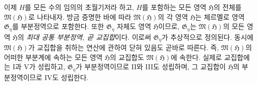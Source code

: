 
이제 $H$를 모든 수의 임의의 초월기저라 하고, $H$를 포함하는 모든 영역 $\mathfrak H$의 전체를 $\mathfrak M(\mathfrak H)$로 나타내자. 방금 증명한 바에 따라 $\mathfrak M(\mathfrak H)$의 각 영역 $\mathfrak H$는 체르멜로 영역 $\mathfrak G_\eta$를 부분정역으로 포함한다. 또한 $\mathfrak G_\eta$ 자체도 영역 $\mathfrak H$이므로, $\mathfrak G_\eta$는 $\mathfrak M(\mathfrak H)$의 모든 영역 $\mathfrak H$의 \emph{최대 공통 부분정역, 곧 교집합}이다. 이로써 $\mathfrak G_\eta$가 추상적으로 정의된다. 동시에 $\mathfrak M(\mathfrak H)$가 교집합을 취하는 연산에 관하여 닫혀 있음도 곧바로 따른다. 즉, $\mathfrak M(\mathfrak H)$의 어떠한 부분계에 속하는 모든 영역 $\mathfrak H$의 교집합도 $\mathfrak M(\mathfrak H)$에 속한다. 실제로 교집합에는 I과 V가 성립하고, $\mathfrak G_\eta$가 부분정역이므로 II와 III도 성립하며, 그 교집합이 $\mathfrak H$의 부분정역이므로 IV도 성립한다.
